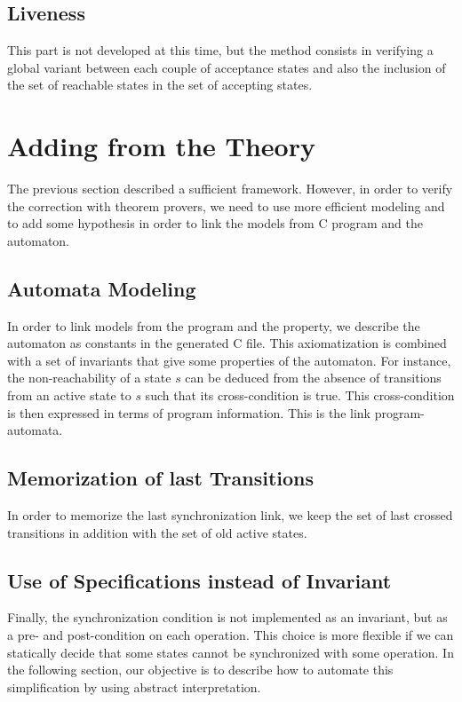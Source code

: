 \documentclass{frama-c-book}
\begin{document}
\subsection{Liveness}

This part is not developed at this time, but the method consists in verifying a
global variant between each couple of acceptance states and also the inclusion
of the set of reachable states in the set of accepting states.

\section{Adding from the Theory}

The previous section described a sufficient framework. However, in
order to verify the correction with theorem provers, we need to use
more efficient modeling and to add some hypothesis in order to link
the models from C program and the automaton.

\subsection{ Automata Modeling}
  In order to link models from the program and the property, we describe the
  automaton as constants in the generated C file. This axiomatization is
  combined with a set of invariants that give some properties of the
  automaton. For instance, the non-reachability of a state $s$ can be deduced
  from the absence of transitions from an active state to $s$ such that its
  cross-condition is true. This cross-condition is then expressed in terms of
  program information. This is the link program-automata.


\subsection{Memorization of last Transitions}
  In order to memorize the last synchronization link, we keep the set of last
  crossed transitions in addition with the set of old active states.

\subsection{Use of Specifications instead of Invariant}
  Finally, the synchronization condition is not implemented as an invariant, but
  as a pre- and post-condition on each operation. This choice is more flexible if
  we can statically decide that some states cannot be synchronized with some
  operation. In the following section, our objective is to describe how to
  automate this simplification by using abstract interpretation.
\end{document}
